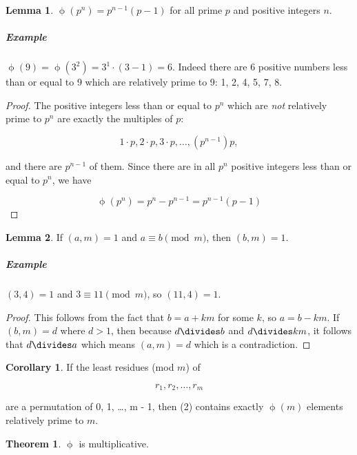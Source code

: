 \documentclass{article}
\theoremstyle{definition} %
\newtheorem{theorem}{Theorem}[section] %
\theoremstyle{definition}
\newtheorem{corollary}{Corollary}[section] %
\theoremstyle{definition}
\newtheorem{lemma}{Lemma}[section]
\newcommand{\tot}{\upphi}
\theoremstyle{definition}
\begin{document}
  \begin{lemma}
    $\tot(p^n) = p^{n-1}(p - 1)$ for all prime $p$ and positive integers $n$.
    \label{lem:totient_prime}
  \end{lemma}
  
  \subparagraph{Example} $\tot(9) = \tot(3^2) = 3^1\cdot(3-1) = 6$. Indeed there are 6 positive
  numbers less than or equal to 9 which are relatively prime to 9: 1, 2, 4, 5, 7, 8.
  
  \begin{proof}
    The positive integers less than or equal to $p^n$ which are \textit{not} relatively prime
    to $p^n$ are exactly the multiples of $p$:
    
    \[
      1\cdot p, 2\cdot p, 3\cdot p, \dots, (p^{n-1})p,
    \]
    
    and there are $p^{n-1}$ of them. Since there are in all $p^n$ positive integers less than
    or equal to $p^n$, we have
    
    \[
      \tot(p^n) = p^n - p^{n-1} = p^{n - 1}(p - 1)
    \]
  \end{proof}
  
  \begin{lemma}
    If $(a, m) = 1$ and $a \equiv b \pmod{m}$, then $(b, m) = 1$.
  \end{lemma}
  
  \subparagraph{Example} $(3, 4) = 1$ and $3 \equiv 11 \pmod{m}$, so $(11, 4) = 1$.
  
  \begin{proof}
    This follows from the fact that $b = a + km$ for some $k$, so $a = b - km$.
    If $(b, m) = d$ where $d > 1$, then because $d \divides b$ and $d \divides km$,
    it follows that $d \divides a$ which means $(a, m) = d$ which is a contradiction.
  \end{proof}
  
  \begin{corollary}
  If the least residues (mod $m$) of
  
  \begin{equation}
    r_1, r_2, \dots, r_m
  \end{equation}
  
  are a permutation of 0, 1, \dots, m - 1, then (2) contains exactly $\tot(m)$ elements
  relatively prime to $m$.
  \end{corollary}
  
  \begin{theorem}
    $\tot$ is multiplicative.
  \end{theorem}
  
\end{document}
